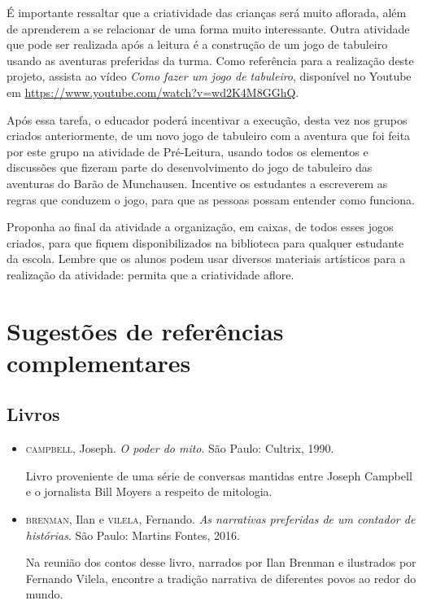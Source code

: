 \documentclass[11pt]{extarticle}
\begin{document}
É importante ressaltar que a criatividade das crianças será muito aflorada, além de aprenderem a se relacionar de uma forma muito interessante. Outra atividade que pode ser realizada após a leitura é a construção de um jogo de tabuleiro usando as aventuras preferidas da turma. Como referência para a realização deste projeto, assista ao vídeo \textit{Como fazer um jogo de tabuleiro}, disponível no Youtube em \url{https://www.youtube.com/watch?v=wd2K4M8GGhQ}. 

Após essa tarefa, o educador poderá incentivar a execução, desta vez nos grupos criados anteriormente, de um novo jogo de tabuleiro com a aventura que foi feita por este grupo na atividade de Pré-Leitura, usando todos os elementos e discussões que fizeram parte do desenvolvimento do jogo de tabuleiro das aventuras do Barão de Munchausen. Incentive os estudantes a escreverem as regras que conduzem o jogo, para que as pessoas possam entender como funciona.

Proponha ao final da atividade a organização, em caixas, de todos esses jogos criados, para que fiquem disponibilizados na biblioteca para qualquer estudante da escola. Lembre que os alunos podem usar diversos materiais artísticos para a realização da atividade: permita que a criatividade aflore. 


\section{Sugestões de referências complementares}

\subsection{Livros} 

\begin{itemize}
\item \textsc{campbell}, Joseph. \textit{O poder do mito}. São Paulo: Cultrix, 1990.

Livro proveniente de uma série de conversas mantidas entre Joseph Campbell e o jornalista Bill Moyers a respeito de mitologia.

\item \textsc{brenman}, Ilan e \textsc{vilela}, Fernando. \textit{As narrativas preferidas de um contador de histórias}. São Paulo: Martins Fontes, 2016.

Na reunião dos contos desse livro, narrados por Ilan Brenman e ilustrados por Fernando Vilela, encontre a tradição narrativa de diferentes povos ao redor do mundo.

\end{itemize}
\end{document}
